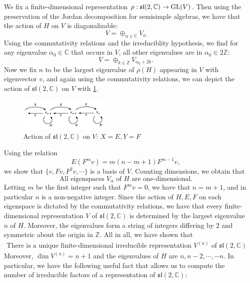 \documentclass{report}
\begin{document}
We fix a finite-dimensional representation $\rho: \mathfrak{sl}(2, \mathbb C) \to \operatorname{{\mathrm{GL}}}(V)$.
Then using the preservation of the Jordan decomposition for semisimple algebras, we have that the action of $H$ on $V$ is diagonalizable:
\[
V = \oplus_{\alpha \in \mathbb C} V_\alpha
\]
Using the commutativity relations and the irreduciblity hypothesis, we find for any eigenvalue $\alpha_0 \in \mathbb C$ that occurs in $V$, all other eigenvalues are in $\alpha_0 \in 2\mathbb Z$:
\[
V = \oplus_{k \in \mathbb Z} V_{\alpha_0 + 2k}.
\]
Now we fix $n$ to be the largest eigenvalue of $\rho(H)$ appearing in $V$ with eigenvector $v$, and again using the commutativity relations, we can depict the action of $\mathfrak{sl}(2, \mathbb C)$ on $V$ with \cref{fig:action_of_sl_2_C_on_V}.
\begin{figure}[h]
    \centering
    \includegraphics[width=0.4\textwidth]{sl_2_C_action.png}
    \caption{Action of $\mathfrak{sl}(2, \mathbb C)$ on $V$: $X=E, Y=F$}
    \label{fig:action_of_sl_2_C_on_V}
\end{figure}
Using the relation
\[
E(F^m v) = m(n-m+1)F^{m-1}v,
\]
we show that $\{v, Fv, F^2v, \cdots \}$ is a basis of $V$.
Counting dimensions, we obtain that
\[
\text{All eigenspaces } V_\alpha \text{ of } H \text{ are one-dimensional.}
\]
Letting $m$ be the first integer such that $F^m v = 0$, we have that $n = m + 1$, and in particular $n$ is a non-negative integer.
Since the action of $H, E, F$ on each eigenspace is dictated by the commutativity relations, we have that every finite-dimensional representation $V$ of $\mathfrak{sl}(2, \mathbb C)$ is determined by the largest eigenvalue $n$ of $H$.
Moreover, the eigenvalues form a string of integers differing by $2$ and symmetric about the origin in $\mathbb Z$.
All in all, we have shown that
\[
\begin{array}{c}
\text{There is a unique finite-dimensional irreducible representation } V^{(n)} \text{ of } \mathfrak{sl}(2, \mathbb C)
\end{array}
\]
Moreover, $\dim V^{(n)} = n+1$ and the eigenvalues of $H$ are $n, n-2, \cdots, -n$.
In particular, we have the following useful fact that allows us to compute the number of irreducible factors of a representation of $\mathfrak{sl}(2, \mathbb C)$:
\end{document}
